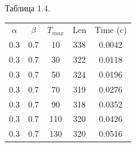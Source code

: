 \documentclass[12pt]{report}
\begin{document}
\begin{minipage}{0.5\textwidth}
\begin{center}
				Таблица 1.4.
				
				\begin{tabular}{|c c c c c|}
					\hline
					$\alpha$ & $\beta$ & $T_{max}$ & Len & Time (c) \\ [0.5ex]
					0.3 & 0.7 & 10 & 338 & 0.0042 \\ 
					\hline 
					0.3 & 0.7 & 30 & 322 & 0.0118 \\ 
					\hline 
					0.3 & 0.7 & 50 & 324 & 0.0196 \\ 
					\hline 
					0.3 & 0.7 & 70 & 319 & 0.0276 \\ 
					\hline 
					0.3 & 0.7 & 90 & 318 & 0.0352 \\ 
					\hline 
					0.3 & 0.7 & 110 & 320 & 0.0426 \\ 
					\hline 
					0.3 & 0.7 & 130 & 320 & 0.0516 \\ 
					\hline 
				\end{tabular}
				
			\end{center}
	\end{minipage}
	\hfill
\end{document}
